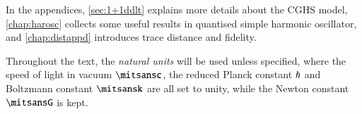 In the appendices, \cref{sec:1+1ddlt} explains more details about the CGHS 
model, \cref{chap:harosc} collects some useful results in quantised simple 
harmonic oscillator, and \cref{chap:distappd} introduces trace distance and 
fidelity.

Throughout the text, the \emph{natural units} will be used unless specified, 
where the speed of light in vacuum $\lc$, the reduced Planck constant $\hslash$ and 
Boltzmann constant $\bk$ are all set to unity, while the Newton constant $\nG$ 
is kept.




